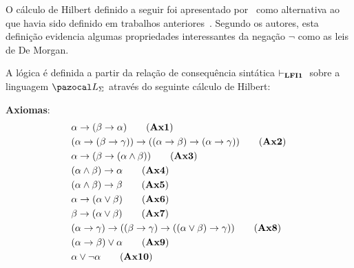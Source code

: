     O cálculo de Hilbert definido a seguir foi apresentado por~ como alternativa ao que havia sido definido em trabalhos anteriores~\cite{carnielli2000formal,carnielli2007}. Segundo os autores, esta definição evidencia algumas propriedades interessantes da negação $\neg$ como as leis de De Morgan.


    \begin{definicao}\label{def:hilbert_lfi1}
        A lógica \lfium{} é definida a partir da relação de consequência sintática $\vdash_{{\normalfont\textbf{LFI1}}{}}{}$ sobre a linguagem $\ling{}$ através do seguinte cálculo de Hilbert:

        \noindent\textbf{Axiomas}:
        \begin{align*}
            & \alpha \to (\beta \to \alpha)                                                     \tag{\textbf{Ax1}}            \label{ax:ax1}\\
            & (\alpha \to (\beta \to \gamma)) \to ((\alpha \to \beta) \to (\alpha \to \gamma )) \tag{\textbf{Ax2}}            \label{ax:ax2}\\
            & \alpha \to (\beta \to (\alpha \land \beta))                                       \tag{\textbf{Ax3}}            \label{ax:ax3}\\
            & (\alpha \land \beta) \to \alpha                                                   \tag{\textbf{Ax4}}            \label{ax:ax4}\\
            & (\alpha \land \beta) \to \beta                                                    \tag{\textbf{Ax5}}            \label{ax:ax5}\\
            & \alpha \to (\alpha \lor \beta)                                                    \tag{\textbf{Ax6}}            \label{ax:ax6}\\
            & \beta \to (\alpha \lor \beta)                                                     \tag{\textbf{Ax7}}            \label{ax:ax7}\\
            & (\alpha \to \gamma) \to ((\beta \to \gamma) \to ((\alpha \lor \beta) \to \gamma)) \tag{\textbf{Ax8}}            \label{ax:ax8}\\
            & (\alpha \to \beta) \lor \alpha                                                    \tag{\textbf{Ax9}}            \label{ax:ax9}\\
            & \alpha \lor \neg \alpha                                                           \tag{\textbf{Ax10}}           \label{ax:ax10}\\

\end{align*}
\end{definicao}
